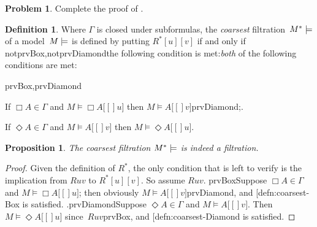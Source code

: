 \documentclass[10pt,a4paper]{article}
\makeatletter
\theoremstyle{plain}
\newtheorem{prop}[thm]{Proposition}
\theoremstyle{definition}
\newtheorem{defn}[thm]{Definition}
\newtheorem{prob}{Problem}[section]
\theoremstyle{remark}
\newenvironment{probtag}[1]{\begin{prob}}{\end{prob}}
\newcommand*{\ollabel}[1]{\label{#1}}
\newcommand{\olref}{\@ifnextchar[{\olref@i}{\olref@final}}
\def\olref@i[#1]{\@ifnextchar[{\olref@ii}{\olref@final}}
\def\olref@ii[#1]{\@ifnextchar[{\olref@iii}{\olref@final}}
\def\olref@iii[#1]{\olref@final}
\def\olref@final#1{\ref{#1}}
\providecommand{\mSat}[3]{\ensuremath{#1 \models #2[#3]}}
\providecommand{\mModel}[2]{\ensuremath{#1 \models #2}}
\providecommand{\iftag}[1]{#1}
\providecommand{\tagitem}[1]{\item[#1]}
\providecommand{\iftag}{}
\makeatother
\begin{document}
\begin{probtag}{probBox,probDiamond}
  Complete the proof of \olref[nml][fil][exf]{prop:finest}.
\end{probtag}

\begin{defn}
  Where $\Gamma$ is closed under subformulas, the \emph{coarsest}
  filtration~$\mModel{M^*}$ of a model~$\mModel{M}$ is defined by
  putting $R^*[u][v]$ if and only if
  \iftag{notprvBox,notprvDiamond}{the following condition is
    met:}{\emph{both} of the following conditions are met:}
  \begin{tagenumerate}{prvBox,prvDiamond}
  \tagitem{prvBox}{\ollabel{defn:coarsest-Box}If $\Box A \in \Gamma$
    and $\mSat{M}{\Box A}[u]$ then
    $\mSat{M}{A}[v]$\iftag{prvDiamond}{;}{.}}{}
  \tagitem{prvDiamond}{\ollabel{defn:coarsest-Diamond}If $\Diamond A
    \in \Gamma$ and $\mSat{M}{A}[v]$ then
    $\mSat{M}{\Diamond A}[u]$.}{}
  \end{tagenumerate}
\end{defn}

\begin{prop}
  The coarsest filtration $\mModel{M^*}$ is indeed a filtration. 
\end{prop}

\begin{proof}
  Given the definition of $R^*$, the only condition that is left to
  verify is the implication from $Ruv$ to $R^*[u][v]$. So assume
  $Ruv$. \iftag{prvBox}{Suppose $\Box A \in \Gamma$ and
    $\mSat{M}{\Box A}[u]$; then obviously
    $\mSat{M}{A}[v]$\iftag{prvDiamond}{, and
      \olref{defn:coarsest-Box} is
      satisfied. }{.}}{}\iftag{prvDiamond}{Suppose $\Diamond A \in
    \Gamma$ and $\mSat{M}{A}[v]$. Then $\mSat{M}{\Diamond A}[u]$
    since~$Ruv$\iftag{prvBox}{, and \olref{defn:coarsest-Diamond} is
      satisfied}{}.}{}
\end{proof}
\end{document}
